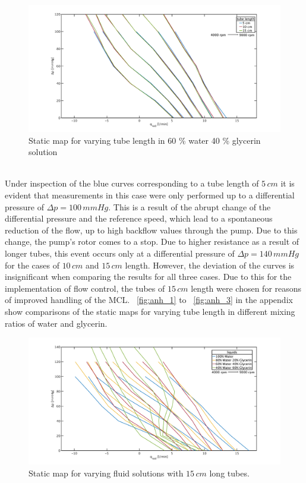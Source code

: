 \begin{figure}[ht]
  \centering
  \includegraphics[width=\textwidth]{images/plots_syst_ident/60w40g_tube_length_new.pdf}
  \caption[Static map for different tube length in 60 \% water 40 \% glycerin solution]{Static map for varying tube length in 60 \% water 40 \% glycerin solution}
  \label{fig:60w_40g}
\end{figure}
\\Under inspection of the blue curves corresponding to a tube length of $5\, cm$ it is evident that measurements in this case were only performed up to a differential pressure of $\Delta{p}=100 \, mmHg$. This is a result of the abrupt change of the differential pressure and the reference speed, which lead to a spontaneous reduction of the flow, up to high backflow values through the pump. Due to this change, the pump's rotor comes to a stop. Due to higher resistance as a result of longer tubes, this event occurs only at a differential pressure of $\Delta{p}=140\, mmHg$ for the cases of $10\, cm$ and $15\, cm$ length. However, the deviation of the curves is insignificant when comparing the results for all three cases. Due to this for the implementation of flow control, the tubes of $15\, cm$ length were chosen for reasons of improved handling of the MCL. \figurename~\ref{fig:anh_1} to \figurename~\ref{fig:anh_3} in the appendix show comparisons of the static maps for varying tube length in different mixing ratios of water and glycerin.
\begin{figure}[ht]
  \centering
  \includegraphics[width=\textwidth]{images/plots_syst_ident/long_liquid_change_new.pdf}
  \caption[Static map for varying fluid solution with $15\,cm$ long tubes]{Static map for varying fluid solutions with $15\,cm$ long tubes.}
  \label{fig:long_tubes}
\end{figure}
